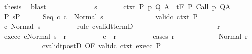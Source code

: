 \begin{isabellebody}
\ {\isacharquery}thesis\ \isamarkupfalse%
\ blast\isanewline
\ \ \ \ \isamarkupfalse%
\isanewline
\ \ \isamarkupfalse%
\isanewline
\ \ \ \ \isamarkupfalse%
\ s\ \isanewline
\ \ \ \ \isamarkupfalse%
\ ctxt{\isacharcolon}\ {\isachardoublequoteopen}{\isasymforall}{\isacharparenleft}P{\isacharcomma}\ p{\isacharcomma}\ Q{\isacharcomma}\ A{\isacharparenright}{\isasymin}{\isasymTheta}{\isachardot}\ {\isasymGamma}\ {\isasymTurnstile}\isactrlsub t\isactrlbsub {\isacharslash}F\isactrlesub \ P\ {\isacharparenleft}Call\ p{\isacharparenright}\ Q{\isacharcomma}A{\isachardoublequoteclose}\isanewline
\ \ \ \ \isamarkupfalse%
\ P{\isacharcolon}\ {\isachardoublequoteopen}s{\isasymin}P{\isachardoublequoteclose}\isanewline
\ \ \ \ \isamarkupfalse%
\ {\isachardoublequoteopen}{\isasymGamma}{\isasymturnstile}Seq\ c{}\ c{}\ {\isasymdown}\ Normal\ s{\isachardoublequoteclose}\isanewline
\ \ \ \ \isamarkupfalse%
\ {\isacharminus}\isanewline
\ \ \ \ \ \ \isamarkupfalse%
\ valid{\isacharunderscore}c{}\ ctxt\ P\isanewline
\ \ \ \ \ \ \isamarkupfalse%
\ {\isachardoublequoteopen}{\isasymGamma}{\isasymturnstile}c{}{\isasymdown}\ Normal\ s{\isachardoublequoteclose}\isanewline
\ \ \ \ \ \ \ \ \isamarkupfalse%
\ {\isacharparenleft}rule\ cvalidt{\isacharunderscore}termD{\isacharparenright}\isanewline
\ \ \ \ \ \ \isamarkupfalse%
\isanewline
\ \ \ \ \ \ \isacommand{{\isacharbraceleft}}\isamarkupfalse%
\isanewline
\ \ \ \ \ \ \ \ \isamarkupfalse%
\ r\ \isamarkupfalse%
\ exec{\isacharunderscore}c{}{\isacharcolon}\ {\isachardoublequoteopen}{\isasymGamma}{\isasymturnstile}{\isasymlangle}c{}{\isacharcomma}Normal\ s{\isasymrangle}\ {\isasymRightarrow}\ r{\isachardoublequoteclose}\isanewline
\ \ \ \ \ \ \ \ \isamarkupfalse%
\ {\isachardoublequoteopen}{\isasymGamma}{\isasymturnstile}c{}\ {\isasymdown}\ r{\isachardoublequoteclose}\isanewline
\ \ \ \ \ \ \ \ \isamarkupfalse%
\ {\isacharparenleft}cases\ r{\isacharparenright}\isanewline
\ \ \ \ \ \ \ \ \ \ \isamarkupfalse%
\ {\isacharparenleft}Normal\ r{\isacharprime}{\isacharparenright}\isanewline
\ \ \ \ \ \ \ \ \ \ \isamarkupfalse%
\ cvalidt{\isacharunderscore}postD\ {\isacharbrackleft}OF\ valid{\isacharunderscore}c{}\ ctxt\ exec{\isacharunderscore}c{}\ P{\isacharbrackright}\isanewline

\end{isabellebody}
